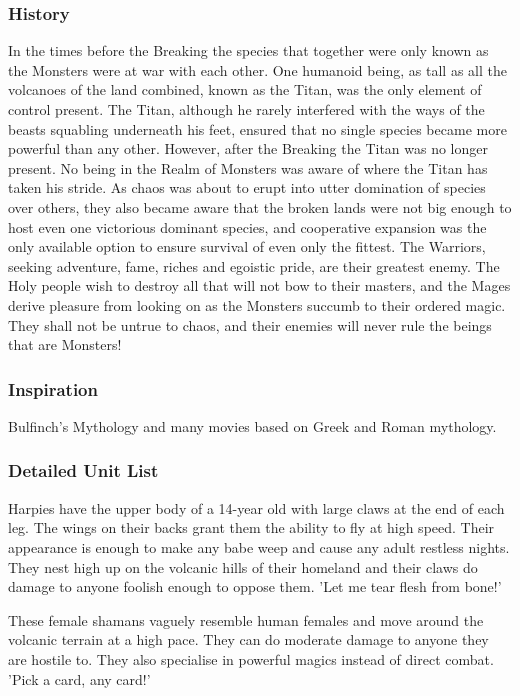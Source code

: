 \documentclass[a4paper]{article}
\begin{document}
\subsubsection{History}

In the times before the Breaking the species that together were only known as the Monsters were at war with each other. One humanoid being, as tall as all the volcanoes of the land combined, known as the Titan, was the only element of control present. The Titan, although he rarely interfered with the ways of the beasts squabling underneath his feet, ensured that no single species became more powerful than any other. However, after the Breaking the Titan was no longer present. No being in the Realm of Monsters was aware of where the Titan has taken his stride. As chaos was about to erupt into utter domination of species over others, they also became aware that the broken lands were not big enough to host even one victorious dominant species, and cooperative expansion was the only available option to ensure survival of even only the fittest. The Warriors, seeking adventure, fame, riches and egoistic pride, are their greatest enemy. The Holy people wish to destroy all that will not bow to their masters, and the Mages derive pleasure from looking on as the Monsters succumb to their ordered magic. They shall not be untrue to chaos, and their enemies will never rule the beings that are Monsters!

\subsubsection{Inspiration}

Bulfinch's Mythology and many movies based on Greek and Roman mythology.

\subsubsection{Detailed Unit List}

Harpies have the upper body of a 14-year old with large claws at the end of each leg. The wings on their backs grant them the ability to fly at high speed. Their appearance is enough to make any babe weep and cause any adult restless nights. They nest high up on the volcanic hills of their homeland and their claws do damage to anyone foolish enough to oppose them. 'Let me tear flesh from bone!'

These female shamans vaguely resemble human females and move around the volcanic terrain at a high pace. They can do moderate damage to anyone they are hostile to. They also specialise in powerful magics instead of direct combat. 'Pick a card, any card!'
\end{document}

